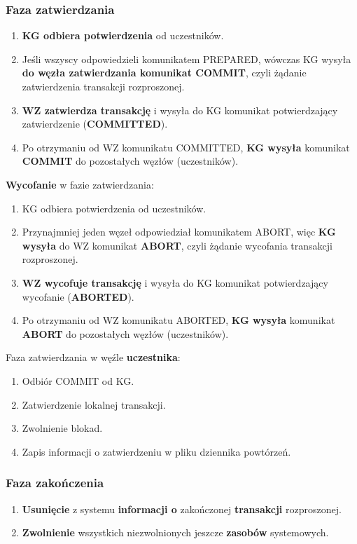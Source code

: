 \documentclass[a4paper]{article}
\begin{document}
    \subsubsection{Faza zatwierdzania}
    \begin{enumerate}
        \item \textbf{KG odbiera potwierdzenia} od uczestników.
        \item Jeśli wszyscy odpowiedzieli komunikatem PREPARED, wówczas KG wysyła
        \textbf{do węzła zatwierdzania komunikat COMMIT}, czyli żądanie zatwierdzenia
        transakcji rozproszonej.
        \item \textbf{WZ zatwierdza transakcję} i wysyła do KG komunikat
        potwierdzający zatwierdzenie (\textbf{COMMITTED}).
        \item Po otrzymaniu od WZ komunikatu COMMITTED, \textbf{KG wysyła} komunikat
        \textbf{COMMIT} do pozostałych węzłów (uczestników).
    \end{enumerate}

    \textbf{Wycofanie} w fazie zatwierdzania:
    \begin{enumerate}
        \item KG odbiera potwierdzenia od uczestników.
        \item Przynajmniej jeden węzeł odpowiedział komunikatem ABORT, więc \textbf{KG wysyła} do
        WZ komunikat \textbf{ABORT}, czyli żądanie wycofania transakcji
        rozproszonej.
        \item \textbf{WZ wycofuje transakcję} i wysyła do KG komunikat
        potwierdzający wycofanie (\textbf{ABORTED}).
        \item Po otrzymaniu od WZ komunikatu ABORTED, \textbf{KG wysyła} komunikat \textbf{ABORT} do pozostałych węzłów
        (uczestników).
    \end{enumerate}

    Faza zatwierdzania w węźle \textbf{uczestnika}:
    \begin{enumerate}
        \item Odbiór COMMIT od KG.
        \item Zatwierdzenie lokalnej transakcji.
        \item Zwolnienie blokad.
        \item Zapis informacji o zatwierdzeniu w pliku dziennika powtórzeń.
    \end{enumerate}

    \subsubsection{Faza zakończenia}
    \begin{enumerate}
        \item \textbf{Usunięcie} z systemu \textbf{informacji o} zakończonej \textbf{transakcji} rozproszonej.
        \item \textbf{Zwolnienie} wszystkich niezwolnionych jeszcze \textbf{zasobów} systemowych.
    \end{enumerate}
\end{document}
